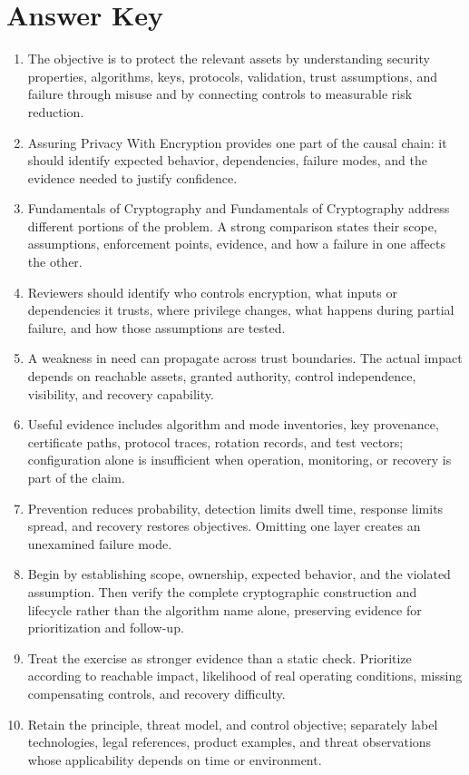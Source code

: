 \documentclass[11pt]{article}
\begin{document}
\section*{Answer Key}
\begin{enumerate}
\item The objective is to protect the relevant assets by understanding security properties, algorithms, keys, protocols, validation, trust assumptions, and failure through misuse and by connecting controls to measurable risk reduction.
\item Assuring Privacy With Encryption provides one part of the causal chain: it should identify expected behavior, dependencies, failure modes, and the evidence needed to justify confidence.
\item Fundamentals of Cryptography and Fundamentals of Cryptography address different portions of the problem. A strong comparison states their scope, assumptions, enforcement points, evidence, and how a failure in one affects the other.
\item Reviewers should identify who controls encryption, what inputs or dependencies it trusts, where privilege changes, what happens during partial failure, and how those assumptions are tested.
\item A weakness in need can propagate across trust boundaries. The actual impact depends on reachable assets, granted authority, control independence, visibility, and recovery capability.
\item Useful evidence includes algorithm and mode inventories, key provenance, certificate paths, protocol traces, rotation records, and test vectors; configuration alone is insufficient when operation, monitoring, or recovery is part of the claim.
\item Prevention reduces probability, detection limits dwell time, response limits spread, and recovery restores objectives. Omitting one layer creates an unexamined failure mode.
\item Begin by establishing scope, ownership, expected behavior, and the violated assumption. Then verify the complete cryptographic construction and lifecycle rather than the algorithm name alone, preserving evidence for prioritization and follow-up.
\item Treat the exercise as stronger evidence than a static check. Prioritize according to reachable impact, likelihood of real operating conditions, missing compensating controls, and recovery difficulty.
\item Retain the principle, threat model, and control objective; separately label technologies, legal references, product examples, and threat observations whose applicability depends on time or environment.
\end{enumerate}
\end{document}
